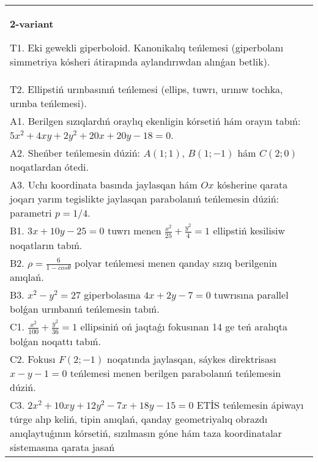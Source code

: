 \documentclass{article}
\begin{document}
\begin{tabular}{m{17cm}}
\textbf{2-variant}
\newline

T1. Eki gewekli giperboloid. Kanonikalıq teńlemesi (giperbolanı simmetriya kósheri átirapında aylandırıwdan alınǵan betlik).\\

T2. Ellipstiń urınbasınıń teńlemesi (ellips, tuwrı, urınıw tochka, urınba teńlemesi).\\

A1. Berilgen sızıqlardıń oraylıq ekenligin kórsetiń hám orayın tabıń: $5 x^{2}+4 xy+2 y^{2}+20 x+20 y-18=0$.\\

A2. Sheńber teńlemesin dúziń: $A (1;1) $, $B (1;-1) $ hám $C (2;0) $ noqatlardan ótedi.\\

A3. Uchı koordinata basında jaylasqan hám $Ox$ kósherine qarata joqarı yarım tegislikte jaylasqan parabolanıń teńlemesin dúziń: parametri $p=1/4$.\\

B1. $3x + 10y - 25 = 0$ tuwrı menen $\frac{x^{2}}{25} + \frac{y^{2}}{4} = 1$ ellipstiń kesilisiw noqatların tabıń.\\

B2. $\rho = \frac{6}{1 - cos\theta}$ polyar teńlemesi menen qanday sızıq berilgenin anıqlań.  \\

B3. $x^{2} - y^{2} = 27$ giperbolasına $4x + 2y - 7 = 0$ tuwrısına parallel bolǵan urınbanıń teńlemesin tabıń.  \\

C1. $\frac{x^{2}}{100} + \frac{y^{2}}{36} = 1$ ellipsiniń oń jaqtaǵı fokusınan 14 ge teń aralıqta bolǵan noqattı tabıń.  \\

C2. Fokusı $F(2; - 1)$ noqatında jaylasqan, sáykes direktrisası $x - y - 1 = 0$ teńlemesi menen berilgen parabolanıń teńlemesin dúziń.  \\

C3. $2x^{2} + 10xy + 12y^{2} - 7x + 18y - 15 = 0$ ETİS teńlemesin ápiwayı túrge alıp keliń, tipin anıqlań, qanday geometriyalıq obrazdı anıqlaytuǵının kórsetiń, sızılmasın góne hám taza koordinatalar sistemasına qarata jasań  \\

\end{tabular}
\vspace{1cm}
\end{document}

